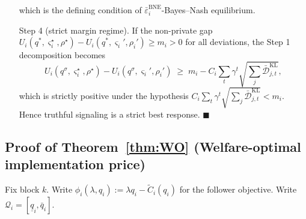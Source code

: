 \documentclass{article}
\begin{document}
\begin{enumerate}
which is the defining condition of $\bar\varepsilon_i^{\mathrm{BNE}}$-Bayes–Nash equilibrium.
    \item[Step 4] (strict margin regime). If the non-private gap $U_i(q^*,\varsigma_i^\star,\rho^\star) - U_i(q^*,\varsigma_i',\rho_i') \ge m_i > 0$ for all deviations, the Step 1 decomposition becomes
$$U_i(q^\sigma,\varsigma_i^\star,\rho^\star) - U_i(q^\sigma,\varsigma_i',\rho_i') \;\ge\; m_i - C_i \sum_t \gamma^t \sqrt{\textstyle\sum_j \bar{\mathcal{D}}_{j,t}^{\mathrm{KL}}},$$
which is strictly positive under the hypothesis $C_i \sum_t \gamma^t \sqrt{\sum_j \bar{\mathcal{D}}_{j,t}^{\mathrm{KL}}} < m_i$. Hence truthful signaling is a strict best response. $\blacksquare$
\end{enumerate}


\subsection{Proof of Theorem~\ref{thm:WO} (Welfare-optimal implementation price)}\label{app:WO}

Fix block $k$. Write $\phi_i(\lambda, q_i) := \lambda q_i - \widetilde C_i(q_i)$ for the follower objective. Write $\mathcal Q_i = [\underline q_i, \bar q_i]$.
\end{document}

